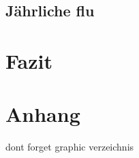 \documentclass[12pt]{scrartcl} %
\begin{document}

\subsection{Jährliche flu}

\newpage %
\section{Fazit}


\newpage
\section{Anhang}
\thispagestyle{empty}

dont forget graphic verzeichnis


\newpage
\setlength{\bibitemsep}{\baselineskip}
\printbibliography[heading=bibintoc]
\thispagestyle{empty}
\end{document}
